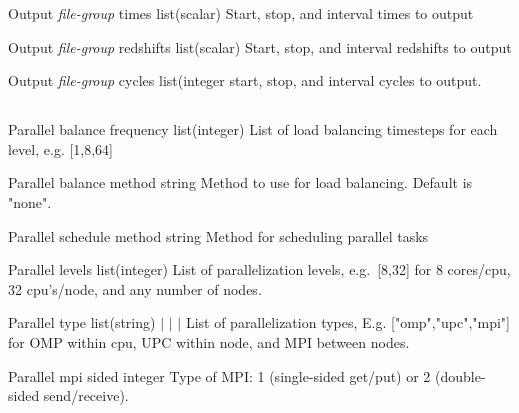 \documentclass{article}
\begin{document}
\Parameter
{Output}
{\textit{file-group}}
{times}
{list(scalar)}
{}
{Start, stop, and interval times to output}
{}
{}

\Parameter
{Output}
{\textit{file-group}}
{redshifts}
{list(scalar)}
{}
{Start, stop, and interval redshifts to output}
{}
{}

\Parameter
{Output}
{\textit{file-group}}
{cycles}
{list(integer}
{}
{start, stop, and interval cycles to output. }
{}
{}

\subsection{}

\Parameter
{Parallel}
{balance}
{frequency}
{list(integer)}
{}
{List of load balancing timesteps for each level, e.g. [1,8,64]}
{}
{}

\Parameter
{Parallel}
{balance}
{method}
{string}
{}
{Method to use for load balancing. Default is "none".}
{}
{}

\Parameter
{Parallel}
{schedule}
{method}
{string}
{}
{Method for scheduling parallel tasks}
{}
{}

\Parameter
{Parallel}
{}
{levels}
{list(integer)}
{}
{List of parallelization levels, e.g.~[8,32] for 8 cores/cpu, 32 cpu's/node, and any number of nodes.}
{}
{}

\Parameter
{Parallel}
{}
{type}
{list(string)}
{ $|$  $|$  $|$ }
{List of parallelization types, E.g. ["omp","upc","mpi"] for OMP within cpu, UPC within node, and MPI between nodes.}
{}
{}

\Parameter
{Parallel}
{mpi}
{sided}
{integer}
{}
{Type of MPI: 1 (single-sided get/put) or 2 (double-sided send/receive). }
{}
{}
\end{document}
